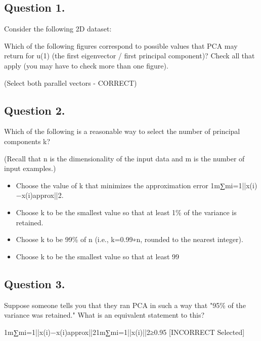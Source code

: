 \documentclass[11pt]{article} %
\begin{document}
\subsection{ Question 1. }

Consider the following 2D dataset:


Which of the following figures correspond to possible values that PCA may return for u(1) (the first eigenvector / first principal component)? 
Check all that apply (you may have to check more than one figure).

(Select both parallel vectors - CORRECT)








\subsection{ Question 2. }
Which of the following is a reasonable way to select the number of principal components k?

(Recall that n is the dimensionality of the input data and m is the number of input examples.)

\begin{itemize}
	\item Choose the value of k that minimizes the approximation error 1m∑mi=1||x(i)−x(i)approx||2.
	
	\item Choose k to be the smallest value so that at least 1\% of the variance is retained.
	
	\item Choose k to be 99\% of n (i.e., k=0.99∗n, rounded to the nearest integer).
	
	\item Choose k to be the smallest value so that at least 99%
	
\end{itemize}
\subsection{ Question 3. }
Suppose someone tells you that they ran PCA in such a way that "95\% of the variance was retained." What is an equivalent statement to this?

1m∑mi=1||x(i)−x(i)approx||21m∑mi=1||x(i)||2≥0.95 [INCORRECT Selected]
\end{document}
